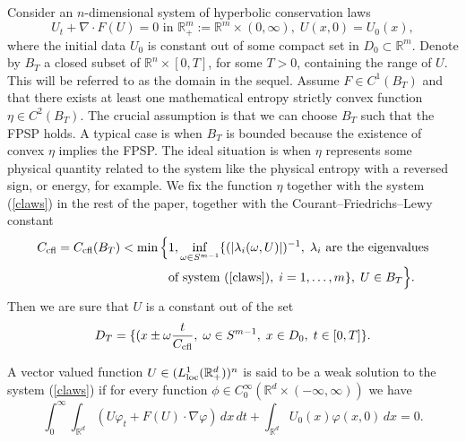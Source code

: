\documentclass[11pt,a4paper,reqno]{amsart}
\theoremstyle{plain}
\theoremstyle{definition}
\theoremstyle{remark}
\numberwithin{equation}{section}
\begin{document}
Consider an $n$-dimensional system of hyperbolic conservation laws %
\begin{equation} \label{claws}
U_{t}+\nabla \cdot F(U) = 0 \text{ in } \mathbb{R}_{+}^{m}:=\mathbb{R} ^{m}
\times  (0,\infty ), \;  U(x,0)=U_{0}(x), 
\end{equation}
where the initial data $U_{0}$ is constant out of some compact set 
in $D_{0}\subset \mathbb{R}^{m}$.
Denote by $B_{T}$ a closed subset of $\mathbb{R}^{n}\times [0,T]$, for some $T>0$,
containing the range of $U$. 
This will be referred to as the domain in the sequel. 
Assume $F\in C^{1}(B_{T})$ and that there exists at least one  
mathematical entropy strictly convex function $\eta \in C^{2}(B_{T})$.
The crucial assumption is that we can choose $B_{T}$ such that 
the FPSP holds. A typical case is 
when $B_{T}$ is bounded because the existence of convex $\eta$ implies 
the FPSP. The ideal situation is when $\eta$ represents some physical quantity
related to the system like the physical entropy with a reversed sign, or energy, 
for example. We fix the function $\eta$ together with the system (\ref{claws})
in the rest of the paper, together with the Courant--Friedrichs--Lewy constant 
\[
\begin{split}
C_{\rm{cfl}}=C_{\rm{cfl}}(B_{T}) < \min\Big\{ & 1,   
\inf_{\omega \in S^{m-1}}\{(|\lambda_{i}(\omega,U)|)^{-1}, \;  \lambda_{i}
\text{ are the eigenvalues} \\ & \text{of system (\ref{claws})},\;   i=1,\ldots,m\}, \; U\in B_{T} \Big\}.
\end{split}
\]
Then we are sure that $U$ is a constant out of the set 
$$
D_{T}=\{(x\pm \omega \frac{t}{C_{\rm cfl}},\; \omega \in S^{m-1},\; x\in D_{0},\; 
t\in[0,T]\}. 
$$
 
A vector valued function $U\in (L_{\rm{loc}}^{1}(\mathbb{R}_{+}^{d}))^{n}$ 
is said to be a weak 
solution to the system (\ref{claws}) if for every function 
$\phi \in C_{0}^{\infty}(\mathbb{R}^{d}\times (-\infty,\infty ))$ 
we have
\begin{equation} \label{sol}
\int^{\infty }_{0}\int_{\mathbb{R} ^{d}}\left( U\varphi_{t}+F\left( U\right) 
\cdot \nabla \varphi \right) \,dx \,dt+\int_{\mathbb{R} ^{d}}U_{0}
\left( x\right) \varphi \left( x,0\right) \,dx=0.
\end{equation}
\end{document}
